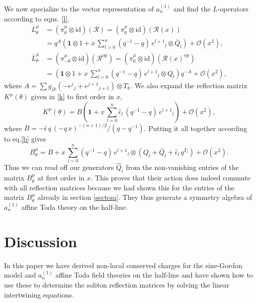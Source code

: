 \documentclass[a4paper,12pt]{article}
\newcommand{\one}{\mathbf{1}}
\newcommand{\id}{\text{id}}
\newcommand{\mub}{\bar{\mu}}
\newcommand{\ur}{{\mathcal R}}
\numberwithin{equation}{section}
\begin{document}
We now specialize to the vector representation of $a_n^{(1)}$ and
find the $L$-operators according to eqns. \eqref{l},
\begin{align}
  L^\mu_\theta&=(\pi^\mu_\theta\otimes\id)(\ur)=(\pi^\mu_0\otimes\id)(\ur(x))\\
  &=q^A\left(\one\otimes
  1+x\,\sum_{l=0}^n(q^{-1}-q)\,e^{l+1}{}_l\otimes\bar{Q}_l\right)
  +{\mathcal O}(x^2),\\
  \bar{L}^{\mub}_\theta&=(\pi^{\mub}_{-\theta}\otimes\id)(\ur^{\text{op}})
  =(\pi^{\mub}_0\otimes\id)(\ur(x)^{\text{op}})\\
  &=\left(\one\otimes
  1+x\,\sum_{l=0}^n(q^{-1}-q)\,e^{l+1}{}_l\otimes{Q}_l\right)q^{-A}
  +{\mathcal O}(x^2),
\end{align}
where $A=\sum g_{jk}(-e^j{}_j+e^{j+1}{}_{j+1})\otimes T_k$. We
also expand the reflection matrix $K^\mu(\theta)$ given in
\eqref{k} to first order in $x$,
\begin{equation}
  K^\mu(\theta)=B\left(\one+x\,\sum_{l=0}^n\hat{\epsilon}_l\,
  (q^{-1}-q)\,e^{l+1}{}_l\right)+{\mathcal O}(x^2),
\end{equation}
where $B=-\hat{\epsilon}\,q\,(-q\,x)^{-(n+1)/2}/(q-q^{-1})$.
Putting it all together according to eq.\eqref{b} gives
\begin{equation}
  B^\mu_\theta=B+x\,\sum_{l=0}^n(q^{-1}-q)\,e^{l+1}{}_l\otimes
  \left(Q_l+\bar{Q}_l+\hat{\epsilon}_l\,q^{T_l}\right)+{\mathcal O}(x^2).
\end{equation}
Thus we can read off our generators $\hat{Q}_i$ from the
non-vanishing entries of the matrix $B^\mu_\theta$ at first order
in $x$. This proves that their action does indeed commute with all
reflection matrices because we had shown this for the entries of
the matrix $B^\mu_\theta$ already in section \ref{sectcsa}. They
thus generate a symmetry algebra of $a_n^{(1)}$ affine Toda theory
on the half-line.



\section{Discussion\label{sectdis}}

In this paper we have derived non-local conserved charges for the
sine-Gordon model and $a_n^{(1)}$ affine Toda field theories on
the half-line and have shown how to use these to determine the
soliton reflection matrices by solving the linear intertwining
equations.
\end{document}
